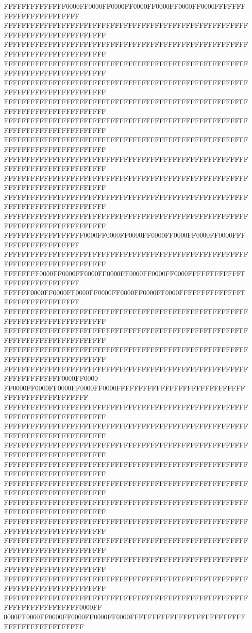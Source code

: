 FFFFFFFFFFFFFF0000FF0000FF0000FF0000FF0000FF0000FF0000FFFFFFFFFFFFFFFFFFFFFFFF
FFFFFFFFFFFFFFFFFFFFFFFFFFFFFFFFFFFFFFFFFFFFFFFFFFFFFFFFFFFFFFFFFFFFFFFFFFFFFF
FFFFFFFFFFFFFFFFFFFFFFFFFFFFFFFFFFFFFFFFFFFFFFFFFFFFFFFFFFFFFFFFFFFFFFFFFFFFFF
FFFFFFFFFFFFFFFFFFFFFFFFFFFFFFFFFFFFFFFFFFFFFFFFFFFFFFFFFFFFFFFFFFFFFFFFFFFFFF
FFFFFFFFFFFFFFFFFFFFFFFFFFFFFFFFFFFFFFFFFFFFFFFFFFFFFFFFFFFFFFFFFFFFFFFFFFFFFF
FFFFFFFFFFFFFFFFFFFFFFFFFFFFFFFFFFFFFFFFFFFFFFFFFFFFFFFFFFFFFFFFFFFFFFFFFFFFFF
FFFFFFFFFFFFFFFFFFFFFFFFFFFFFFFFFFFFFFFFFFFFFFFFFFFFFFFFFFFFFFFFFFFFFFFFFFFFFF
FFFFFFFFFFFFFFFFFFFFFFFFFFFFFFFFFFFFFFFFFFFFFFFFFFFFFFFFFFFFFFFFFFFFFFFFFFFFFF
FFFFFFFFFFFFFFFFFFFFFFFFFFFFFFFFFFFFFFFFFFFFFFFFFFFFFFFFFFFFFFFFFFFFFFFFFFFFFF
FFFFFFFFFFFFFFFFFFFFFFFFFFFFFFFFFFFFFFFFFFFFFFFFFFFFFFFFFFFFFFFFFFFFFFFFFFFFFF
FFFFFFFFFFFFFFFFFFFFFFFFFFFFFFFFFFFFFFFFFFFFFFFFFFFFFFFFFFFFFFFFFFFFFFFFFFFFFF
FFFFFFFFFFFFFFFFFFFFFFFFFFFFFFFFFFFFFFFFFFFFFFFFFFFFFFFFFFFFFFFFFFFFFFFFFFFFFF
FFFFFFFFFFFFFFFFFF0000FF0000FF0000FF0000FF0000FF0000FF0000FFFFFFFFFFFFFFFFFFFF
FFFFFFFFFFFFFFFFFFFFFFFFFFFFFFFFFFFFFFFFFFFFFFFFFFFFFFFFFFFFFFFFFFFFFFFFFFFFFF
FFFFFFFF0000FF0000FF0000FF0000FF0000FF0000FF0000FFFFFFFFFFFFFFFFFFFFFFFFFFFFFF
FFFFFF0000FF0000FF0000FF0000FF0000FF0000FF0000FFFFFFFFFFFFFFFFFFFFFFFFFFFFFFFF
FFFFFFFFFFFFFFFFFFFFFFFFFFFFFFFFFFFFFFFFFFFFFFFFFFFFFFFFFFFFFFFFFFFFFFFFFFFFFF
FFFFFFFFFFFFFFFFFFFFFFFFFFFFFFFFFFFFFFFFFFFFFFFFFFFFFFFFFFFFFFFFFFFFFFFFFFFFFF
FFFFFFFFFFFFFFFFFFFFFFFFFFFFFFFFFFFFFFFFFFFFFFFFFFFFFFFFFFFFFFFFFFFFFFFFFFFFFF
FFFFFFFFFFFFFFFFFFFFFFFFFFFFFFFFFFFFFFFFFFFFFFFFFFFFFFFFFFFFFFFFFFFF0000FF0000
FF0000FF0000FF0000FF0000FF0000FFFFFFFFFFFFFFFFFFFFFFFFFFFFFFFFFFFFFFFFFFFFFFFF
FFFFFFFFFFFFFFFFFFFFFFFFFFFFFFFFFFFFFFFFFFFFFFFFFFFFFFFFFFFFFFFFFFFFFFFFFFFFFF
FFFFFFFFFFFFFFFFFFFFFFFFFFFFFFFFFFFFFFFFFFFFFFFFFFFFFFFFFFFFFFFFFFFFFFFFFFFFFF
FFFFFFFFFFFFFFFFFFFFFFFFFFFFFFFFFFFFFFFFFFFFFFFFFFFFFFFFFFFFFFFFFFFFFFFFFFFFFF
FFFFFFFFFFFFFFFFFFFFFFFFFFFFFFFFFFFFFFFFFFFFFFFFFFFFFFFFFFFFFFFFFFFFFFFFFFFFFF
FFFFFFFFFFFFFFFFFFFFFFFFFFFFFFFFFFFFFFFFFFFFFFFFFFFFFFFFFFFFFFFFFFFFFFFFFFFFFF
FFFFFFFFFFFFFFFFFFFFFFFFFFFFFFFFFFFFFFFFFFFFFFFFFFFFFFFFFFFFFFFFFFFFFFFFFFFFFF
FFFFFFFFFFFFFFFFFFFFFFFFFFFFFFFFFFFFFFFFFFFFFFFFFFFFFFFFFFFFFFFFFFFFFFFFFFFFFF
FFFFFFFFFFFFFFFFFFFFFFFFFFFFFFFFFFFFFFFFFFFFFFFFFFFFFFFFFFFFFFFFFFFFFFFFFFFFFF
FFFFFFFFFFFFFFFFFFFFFFFFFFFFFFFFFFFFFFFFFFFFFFFFFFFFFFFFFFFFFFFFFFFFFFFFFFFFFF
FFFFFFFFFFFFFFFFFFFFFFFFFFFFFFFFFFFFFFFFFFFFFFFFFFFFFFFFFFFFFFFFFFFFFFFFFFFFFF
FFFFFFFFFFFFFFFFFFFFFFFFFFFFFFFFFFFFFFFFFFFFFFFFFFFFFFFFFFFFFFFFFFFFFFFF0000FF
0000FF0000FF0000FF0000FF0000FF0000FFFFFFFFFFFFFFFFFFFFFFFFFFFFFFFFFFFFFFFFFFFF
